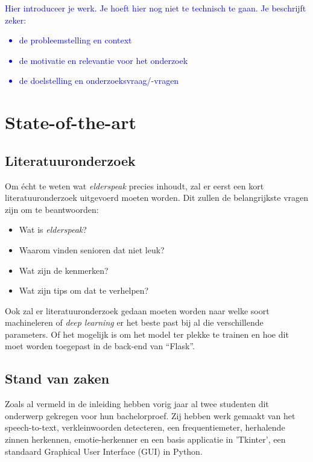 \textcolor{blue}{Hier introduceer je werk. Je hoeft hier nog niet te technisch te gaan.
Je beschrijft zeker:
\begin{itemize}
  \item de probleemstelling en context
  \item de motivatie en relevantie voor het onderzoek
  \item de doelstelling en onderzoeksvraag/-vragen
\end{itemize}}


\section{State-of-the-art}
\label{sec:state-of-the-art}

\subsection{Literatuuronderzoek}
Om écht te weten wat \textit{elderspeak} precies inhoudt, zal er eerst een kort literatuuronderzoek uitgevoerd moeten worden. Dit zullen de belangrijkste vragen zijn om te beantwoorden:
\begin{itemize}
	\item Wat is \textit{elderspeak}?
	\item Waarom vinden senioren dat niet leuk?
	\item Wat zijn de kenmerken?
	\item Wat zijn tips om dat te verhelpen?
\end{itemize}

Ook zal er literatuuronderzoek gedaan moeten worden naar welke soort machineleren of \textit{deep learning} er het beste past bij al die verschillende parameters. Of het mogelijk is om het model ter plekke te trainen en hoe dit moet worden toegepast in de back-end van ``Flask''.

\subsection{Stand van zaken}
Zoals al vermeld in de inleiding hebben vorig jaar al twee studenten dit onderwerp gekregen voor hun bachelorproef. Zij hebben werk gemaakt van het speech-to-text, verkleinwoorden detecteren, een frequentiemeter, herhalende zinnen herkennen, emotie-herkenner en een basis applicatie in 'Tkinter', een standaard Graphical User Interface (GUI) in Python.

